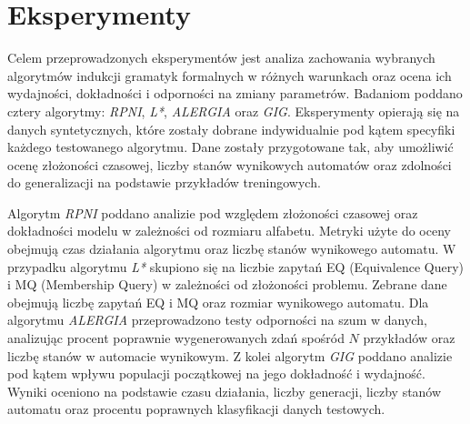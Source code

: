 \chapter{Eksperymenty}
\label{cha:eksperymenty}


Celem przeprowadzonych eksperymentów jest analiza zachowania wybranych algorytmów indukcji gramatyk formalnych w różnych warunkach oraz ocena ich wydajności, dokładności i odporności na zmiany parametrów. Badaniom poddano cztery algorytmy: \textit{RPNI}, \textit{L*}, \textit{ALERGIA} oraz \textit{GIG}. Eksperymenty opierają się na danych syntetycznych, które zostały dobrane indywidualnie pod kątem specyfiki każdego testowanego algorytmu. Dane zostały przygotowane tak, aby umożliwić ocenę złożoności czasowej, liczby stanów wynikowych automatów oraz zdolności do generalizacji na podstawie przykładów treningowych.  

Algorytm \textit{RPNI} poddano analizie pod względem złożoności czasowej oraz dokładności modelu w zależności od rozmiaru alfabetu. Metryki użyte do oceny obejmują czas działania algorytmu oraz liczbę stanów wynikowego automatu. W przypadku algorytmu \textit{L*} skupiono się na liczbie zapytań EQ (Equivalence Query) i MQ (Membership Query) w zależności od złożoności problemu. Zebrane dane obejmują liczbę zapytań EQ i MQ oraz rozmiar wynikowego automatu. Dla algorytmu \textit{ALERGIA} przeprowadzono testy odporności na szum w danych, analizując procent poprawnie wygenerowanych zdań spośród \( N \) przykładów oraz liczbę stanów w automacie wynikowym. Z kolei algorytm \textit{GIG} poddano analizie pod kątem wpływu populacji początkowej na jego dokładność i wydajność. Wyniki oceniono na podstawie czasu działania, liczby generacji, liczby stanów automatu oraz procentu poprawnych klasyfikacji danych testowych.


